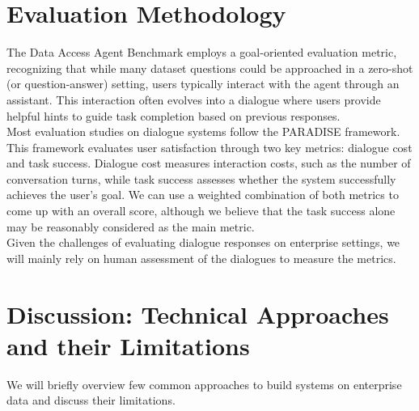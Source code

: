 \documentclass[11pt,a4paper]{article}
\begin{document}

\section{Evaluation Methodology}

The Data Access Agent Benchmark employs a goal-oriented evaluation metric\cite{42}, recognizing that while many dataset questions could be approached in a zero-shot (or question-answer) setting, users typically interact with the agent through an assistant. This interaction often evolves into a dialogue where users provide helpful hints to guide task completion based on previous responses.\\

Most evaluation studies on dialogue systems follow the PARADISE\cite{43} framework. This framework evaluates user satisfaction through two key metrics: dialogue cost and task success. Dialogue cost measures interaction costs, such as the number of conversation turns, while task success assesses whether the system successfully achieves the user's goal. We can use a weighted combination of both metrics to come up with an overall score, although we believe that the task success alone may be reasonably considered as the main metric.\\

Given the challenges of evaluating dialogue responses on enterprise settings\cite{19}, we will mainly rely on human assessment of the dialogues to measure the metrics.

\section{Discussion: Technical Approaches and their Limitations}

We will briefly overview few common approaches to build systems on enterprise data and discuss their limitations.
\end{document}
